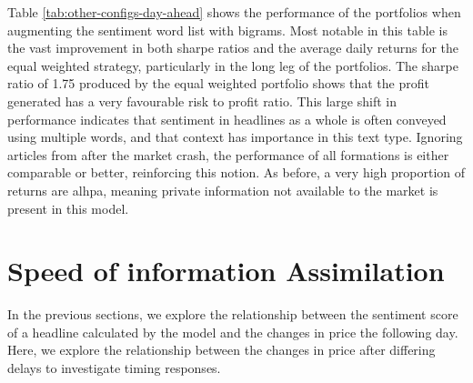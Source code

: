 Table \ref{tab:other-configs-day-ahead} shows the performance of the portfolios when augmenting the sentiment word list with bigrams. Most notable in this table is the vast improvement in both sharpe ratios and the average daily returns for the equal weighted strategy, particularly in the long leg of the portfolios. The sharpe ratio of 1.75 produced by the equal weighted portfolio shows that the profit generated has a very favourable risk to profit ratio. This large shift in performance indicates that sentiment in headlines as a whole is often conveyed using multiple words, and that context has importance in this text type. Ignoring articles from after the market crash, the performance of all formations is either comparable or better, reinforcing this notion. As before, a very high proportion of returns are alhpa, meaning private information not available to the market is present in this model.


\section{Speed of information Assimilation}
\label{sec:speed-assim}

In the previous sections, we explore the relationship between the sentiment score of a headline calculated by the model and the changes in price the following day. Here, we explore the relationship between the changes in price after differing delays to investigate timing responses.

